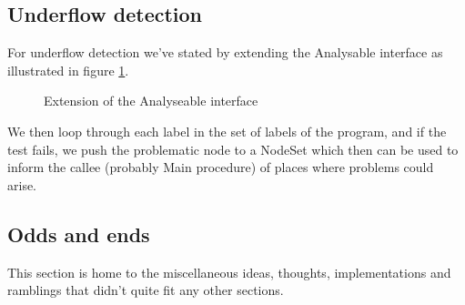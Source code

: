 \subsection{Underflow detection}

For underflow detection we've stated by extending the Analysable interface as illustrated in figure \ref{fig:analysable_underflow_extension}.
\begin{figure}
\centering
{}
\caption{Extension of the Analyseable interface}
\label{fig:analysable_underflow_extension}
\end{figure}

We then loop through each label in the set of labels of the program, and if the test fails, we push the problematic node to a NodeSet which then can be used to inform the callee (probably Main procedure) of places where problems could arise.




\subsection{Odds and ends}
This section is home to the miscellaneous ideas, thoughts, implementations and ramblings that didn't quite fit any other sections.

